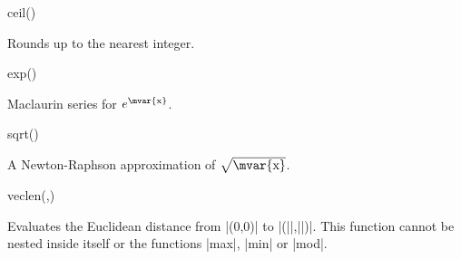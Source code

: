 \begin{math-function}{ceil()}

	Rounds  up to the nearest integer. 

\begin{codeexample}[post=\tt\footnotesize\pgfmathresult]
\end{codeexample}

\begin{codeexample}[post=\tt\footnotesize\pgfmathresult]
\end{codeexample}

\end{math-function}

\begin{math-function}{exp()}

	Maclaurin series for $e^\textrm{\mvar{x}}$. 
	
\begin{codeexample}[post=\tt\footnotesize\pgfmathresult]
\end{codeexample}

\begin{codeexample}[post=\tt\footnotesize\pgfmathresult]
\end{codeexample}

\end{math-function}

\begin{math-function}{sqrt()}

 A Newton-Raphson approximation of $\sqrt{\textrm{\mvar{x}}}$.  

\begin{codeexample}[post=\tt\footnotesize\pgfmathresult]
\end{codeexample}

\begin{codeexample}[post=\tt\footnotesize\pgfmathresult]
\end{codeexample}


\end{math-function}

\begin{math-function}{veclen(,)}

	Evaluates the Euclidean distance from |(0,0)| to |(||,||)|. 
	This function cannot be nested inside itself or the functions |max|,
	|min| or |mod|.

\begin{codeexample}[post=\tt\footnotesize\pgfmathresult]
\end{codeexample}

\begin{codeexample}[post=\tt\footnotesize\pgfmathresult]
\end{codeexample}

\end{math-function}

